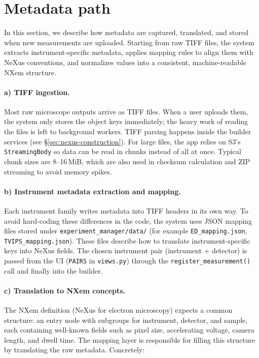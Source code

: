 
\section{Metadata path}\label{sec:metadata-path}

In this section, we describe how metadata are captured, translated, and stored 
when new measurements are uploaded. Starting from raw TIFF files, the system 
extracts instrument-specific metadata, applies mapping rules to align them with 
NeXus conventions, and normalizes values into a consistent, machine-readable 
NXem structure.

\paragraph{a) TIFF ingestion.}
Most raw microscope outputs arrive as TIFF files. When a user uploads them, the system only stores the object keys immediately; 
the heavy work of reading the files is left to background workers. 
TIFF parsing happens inside the builder services (see \S\ref{sec:nexus-construction}). 
For large files, the app relies on S3’s \texttt{StreamingBody} so data can be read in chunks instead of all at once. 
Typical chunk sizes are 8–16\,MiB, which are also used in checksum calculation and ZIP streaming to avoid memory spikes.

\paragraph{b) Instrument metadata extraction and mapping.}
Each instrument family writes metadata into TIFF headers in its own way. 
To avoid hard-coding these differences in the code, the system uses JSON mapping files stored under \texttt{experiment\_manager/data/} 
(for example \texttt{ED\_mapping.json}, \texttt{TVIPS\_mapping.json}). 
These files describe how to translate instrument-specific keys into NeXus fields. 
The chosen instrument pair (instrument + detector) is passed from the UI (\texttt{PAIRS} in \texttt{views.py}) 
through the \texttt{register\_measurement()} call and finally into the builder.

\paragraph{c) Translation to NXem concepts.}
The NXem definition (NeXus for electron microscopy) expects a common structure: 
an entry node with subgroups for instrument, detector, and sample, each containing well-known fields 
such as pixel size, accelerating voltage, camera length, and dwell time. 
The mapping layer is responsible for filling this structure by translating the raw metadata. Concretely:

